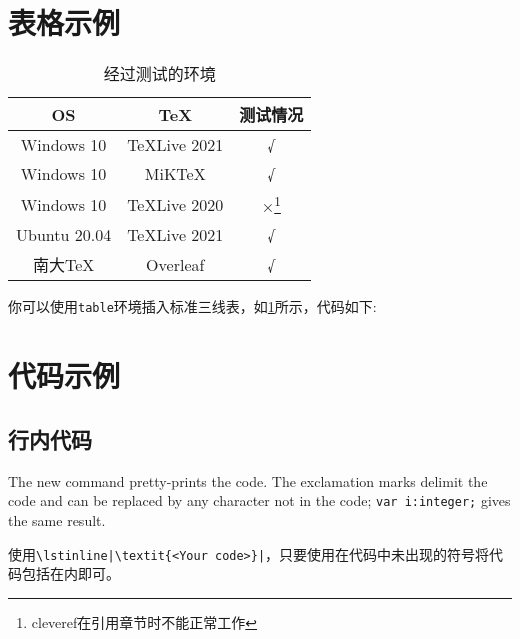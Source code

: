 \section{表格示例}
\begin{table}[htbp]
    \caption{经过测试的环境}
    \label{tab:testtab}
    \begin{tabular}{ccc}
        \toprule
        OS & TeX & 测试情况 \\
        \midrule
        Windows 10 & TeXLive 2021 & √ \\
        Windows 10 & MiKTeX & √ \\
        Windows 10 & TeXLive 2020 & ×\footnote{cleveref在引用章节时不能正常工作}  \\
        Ubuntu 20.04 & TeXLive 2021 & √ \\
        南大TeX & Overleaf & √ \\
        \bottomrule
    \end{tabular}
\end{table}
你可以使用\lstinline|table|环境插入标准三线表，如\cref{tab:testtab}所示，代码如下:


\section{代码示例}


\subsection{行内代码}
The new command pretty-prints the code. The exclamation marks delimit
the code and can be replaced by any character not in the code;
\lstinline$var i:integer;$ gives the same result.

使用\lstinline!\lstinline|\textit{<Your code>}|!，只要使用在代码中未出现的符号将代码包括在内即可。
